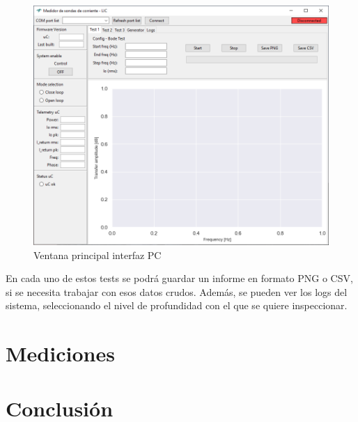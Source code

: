 \documentclass[titlepage, 12pt]{article}
\begin{document}
\begin{figure}[!htbp]
    \centering
    \includegraphics[scale=0.6]{images/software.png}
    \caption{Ventana principal interfaz PC}
    \label{fig:software}
\end{figure}

En cada uno de estos tests se podrá guardar un informe en formato PNG o CSV, si se necesita trabajar con esos datos crudos. Además, se pueden ver los logs del sistema, seleccionando el nivel de profundidad con el que se quiere inspeccionar.

\section{Mediciones}

\section{Conclusión}


\newpage
\printbibliography
\end{document}
